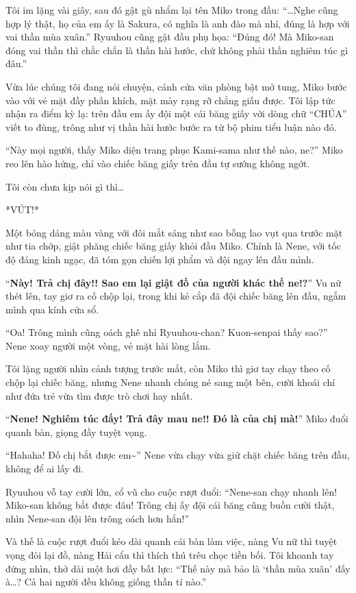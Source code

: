\documentclass[../main.tex]{subfiles}
\begin{document}
Tôi im lặng vài giây, sau đó gật gù nhẩm lại tên Miko trong đầu: ``\dots Nghe cũng hợp lý thật, họ của em ấy là Sakura, có nghĩa là anh đào mà nhỉ, đúng là hợp với vai thần mùa xuân.'' Ryuuhou cũng gật đầu phụ họa: ``Đúng đó! Mà Miko-san đóng vai thần thì chắc chắn là thần hài hước, chứ không phải thần nghiêm túc gì đâu.''

Vừa lúc chúng tôi đang nói chuyện, cánh cửa văn phòng bật mở tung, Miko bước vào với vẻ mặt đầy phấn khích, mặt mày rạng rỡ chẳng giấu được. Tôi lập tức nhận ra điểm kỳ lạ: trên đầu em ấy đội một cái băng giấy với dòng chữ ``CHÚA'' viết to đùng, trông như vị thần hài hước bước ra từ bộ phim tiểu luận nào đó.

``Này mọi người, thấy Miko diện trang phục Kami-sama như thế nào, ne?'' Miko reo lên hào hứng, chỉ vào chiếc băng giấy trên đầu tự sướng không ngớt.

Tôi còn chưa kịp nói gì thì\dots

*VÚT!*

Một bóng dáng màu vàng với đôi mắt sáng như sao bỗng lao vụt qua trước mặt như tia chớp, giật phăng chiếc băng giấy khỏi đầu Miko. Chính là Nene, với tốc độ đáng kinh ngạc, đã tóm gọn chiến lợi phẩm và đội ngay lên đầu mình.

``\textbf{Này! Trả chị đây!! Sao em lại giật đồ của người khác thế ne!?}'' Vu nữ thét lên, tay giơ ra cố chộp lại, trong khi kẻ cắp đã đội chiếc băng lên đầu, ngắm mình qua kính cửa sổ.

``Oa! Trông mình cũng oách ghê nhỉ Ryuuhou-chan? Kuon-senpai thấy sao?'' Nene xoay người một vòng, vẻ mặt hài lòng lắm.


Tôi lặng người nhìn cảnh tượng trước mắt, còn Miko thì giơ tay chạy theo cố chộp lại chiếc băng, nhưng Nene nhanh chóng né sang một bên, cười khoái chí như đứa trẻ vừa tìm được trò chơi hay nhất.

``\textbf{Nene! Nghiêm túc đấy! Trả đây mau ne!! Đó là của chị mà!}'' Miko đuổi quanh bàn, giọng đầy tuyệt vọng.

``Hahaha! Đố chị bắt được em\~{}'' Nene vừa chạy vừa giữ chặt chiếc băng trên đầu, không để ai lấy đi.

Ryuuhou vỗ tay cười lớn, cổ vũ cho cuộc rượt đuổi: ``Nene-san chạy nhanh lên! Miko-san không bắt được đâu! Trông chị ấy đội cái băng cũng buồn cười thật, nhìn Nene-san đội lên trông oách hơn hẳn!''

Và thế là cuộc rượt đuổi kéo dài quanh cái bàn làm việc, nàng Vu nữ thì tuyệt vọng đòi lại đồ, nàng Hải cẩu thì thích thú trêu chọc tiền bối. Tôi khoanh tay đứng nhìn, thở dài một hơi đầy bất lực: ``Thế này mà bảo là `thần mùa xuân' đấy à\dots? Cả hai người đều không giống thần tí nào.''
\end{document}
